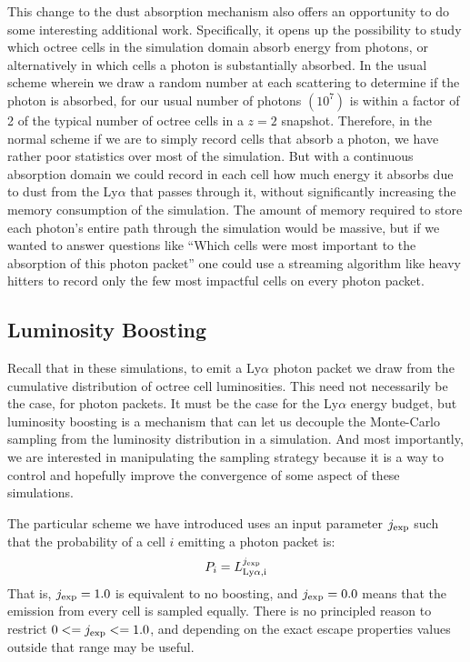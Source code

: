 This change to the dust absorption mechanism also offers an opportunity to do some interesting additional work.
Specifically, it opens up the possibility to study which octree cells in the simulation domain absorb energy from photons, or alternatively in which cells a photon is substantially absorbed.
In the usual scheme wherein we draw a random number at each scattering to determine if the photon is absorbed, for our usual number of photons $(10^{7})$ is within a factor of 2 of the typical number of octree cells in a $z=2$ snapshot.
Therefore, in the normal scheme if we are to simply record cells that absorb a photon, we have rather poor statistics over most of the simulation.
But with a continuous absorption domain we could record in each cell how much energy it absorbs due to dust from the Ly$\alpha$ that passes through it, without significantly increasing the memory consumption of the simulation.
The amount of memory required to store each photon's entire path through the simulation would be massive, but if we wanted to answer questions like ``Which cells were most important to the absorption of this photon packet'' one could use a streaming algorithm like heavy hitters to record only the few most impactful cells on every photon packet.

\subsection{Luminosity Boosting}
Recall that in these simulations, to emit a Ly$\alpha$ photon packet we draw from the cumulative distribution of octree cell luminosities.
This need not necessarily be the case, for photon packets.
It must be the case for the Ly$\alpha$ energy budget, but luminosity boosting is a mechanism that can let us decouple the Monte-Carlo sampling from the luminosity distribution in a simulation.
And most importantly, we are interested in manipulating the sampling strategy because it is a way to control and hopefully improve the convergence of some aspect of these simulations.

The particular scheme we have introduced uses an input parameter $j_{\rm exp}$ such that the probability of a cell $i$ emitting a photon packet is:
\begin{equation}
    P_{i} = L_{\rm Ly \alpha, i} ^{j_{\rm exp}}
\end{equation}
That is, $j_{\rm exp} = 1.0$ is equivalent to no boosting, and $j_{\rm exp} = 0.0$ means that the emission from every cell is sampled equally.
There is no principled reason to restrict $0 <= j_{\rm exp} <= 1.0$, and depending on the exact escape properties values outside that range may be useful.

